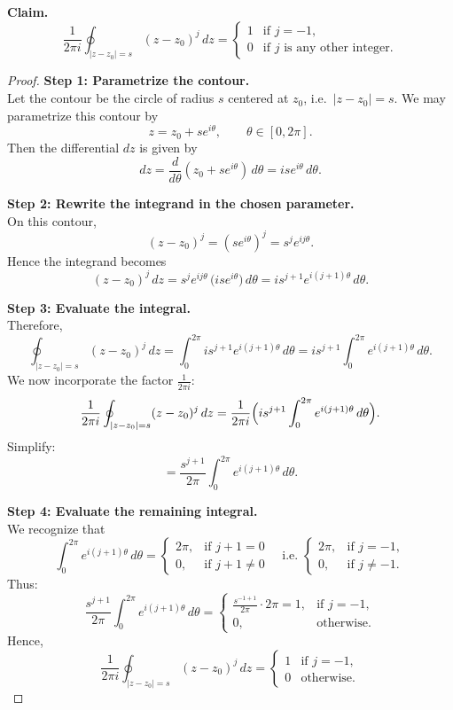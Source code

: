 \documentclass[12pt]{article}
\title{}
\author{Jerich Lee}
\date{\today}
\theoremstyle{definition} %
\theoremstyle{plain} %
\begin{document}
\maketitle
\textbf{Claim.} 
\[
\frac{1}{2\pi i}\oint_{|z - z_0| = s} (z - z_0)^j \, dz 
= 
\begin{cases}
1 & \text{if } j = -1,\\
0 & \text{if } j \text{ is any other integer}.
\end{cases}
\]

\begin{proof}
\textbf{Step 1: Parametrize the contour.}\\
Let the contour be the circle of radius $s$ centered at $z_0$, i.e.\ $|z - z_0| = s$. We may parametrize this contour by
\[
z = z_0 + s e^{i\theta},
\quad\quad
\theta \in [0,2\pi].
\]
Then the differential $dz$ is given by
\[
dz = \frac{d}{d\theta}(z_0 + s e^{i\theta}) \, d\theta 
= i s e^{i\theta} \, d\theta.
\]

\noindent
\textbf{Step 2: Rewrite the integrand in the chosen parameter.}\\
On this contour,
\[
(z - z_0)^j = (s e^{i\theta})^j = s^j e^{i j \theta}.
\]
Hence the integrand becomes
\[
(z - z_0)^j \, dz 
= s^j e^{i j \theta} \,\bigl(i s e^{i\theta}\bigr) \, d\theta 
= i s^{j+1} e^{i (j+1)\theta} \, d\theta.
\]

\noindent
\textbf{Step 3: Evaluate the integral.}\\
Therefore,
\[
\oint_{|z - z_0|=s} (z - z_0)^j \, dz 
= 
\int_{0}^{2\pi} i s^{j+1} e^{i (j+1)\theta} \, d\theta 
= 
i s^{j+1} \int_{0}^{2\pi} e^{i (j+1)\theta} \, d\theta.
\]
We now incorporate the factor $\frac{1}{2 \pi i}$:
\[
\frac{1}{2\pi i}
\oint_{|z - z_0| = s} (z - z_0)^j \, dz 
= 
\frac{1}{2\pi i} 
\Bigl(
i s^{j+1} \int_{0}^{2\pi} e^{i (j+1)\theta} \, d\theta
\Bigr).
\]
Simplify:
\[
= 
\frac{s^{j+1}}{2\pi} 
\int_{0}^{2\pi} e^{i (j+1)\theta} \, d\theta.
\]

\noindent
\textbf{Step 4: Evaluate the remaining integral.}\\
We recognize that
\[
\int_{0}^{2\pi} e^{i (j+1)\theta} \, d\theta 
=
\begin{cases}
2\pi, & \text{if } j+1 = 0 \\
0, & \text{if } j+1 \neq 0
\end{cases}
\quad
\text{i.e. }
\begin{cases}
2\pi, & \text{if } j = -1, \\
0, & \text{if } j \neq -1.
\end{cases}
\]
Thus:
\[
\frac{s^{j+1}}{2\pi} \int_{0}^{2\pi} e^{i (j+1)\theta} \, d\theta 
= 
\begin{cases}
\frac{s^{-1+1}}{2\pi} \cdot 2\pi = 1, & \text{if } j = -1, \\
0, & \text{otherwise}.
\end{cases}
\]
Hence,
\[
\frac{1}{2\pi i}\oint_{|z - z_0| = s} (z - z_0)^j \, dz 
= 
\begin{cases}
1 & \text{if } j = -1,\\
0 & \text{otherwise}.
\end{cases}
\]

\end{proof}
\end{document}
